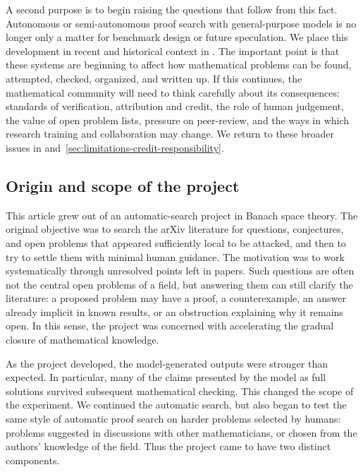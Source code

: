 \documentclass[11pt,reqno]{amsart}
\theoremstyle{plain}
\theoremstyle{definition}
\begin{document}
A second purpose is to begin raising the questions that follow from this fact. Autonomous or semi-autonomous proof search with general-purpose models is no longer only a matter for benchmark design or future speculation.  We place this development in recent and historical context in . The important point is that these systems are beginning to affect how mathematical problems can be found, attempted, checked, organized, and written up. If this continues, the mathematical community will need to think carefully about its consequences: standards of verification, attribution and credit, the role of human judgement, the value of open problem lists, pressure on peer-review, and the ways in which research training and collaboration may change.  We return to these broader issues in  and~\ref{sec:limitations-credit-responsibility}.

\subsection{Origin and scope of the project}
\label{sec:origin-scope} This article grew out of an automatic\allowbreak-search project in Banach space theory.  The original objective was to search the arXiv literature for questions, conjectures, and open problems that appeared sufficiently local to be attacked, and then to try to settle them with minimal human guidance. The motivation was to work systematically through unresolved points left in papers.  Such questions are often not the central open problems of a field, but answering them can still clarify the literature: a proposed problem may have a proof, a counterexample, an answer already implicit in known results, or an obstruction explaining why it remains open.  In this sense, the project was concerned with accelerating the gradual closure of mathematical knowledge.

As the project developed, the model-generated outputs were stronger than expected.  In particular, many of the claims presented by the model as full solutions survived subsequent mathematical checking.  This changed the scope of the experiment.  We continued the automatic search, but also began to test the same style of automatic proof search on harder problems selected by humans: problems suggested in discussions with other mathematicians, or chosen from the authors' knowledge of the field.  Thus the project came to have two distinct components.
\end{document}
